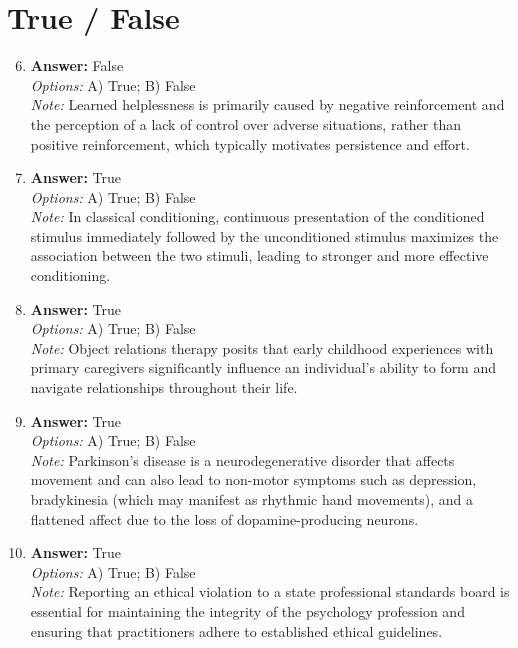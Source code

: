 \documentclass[12pt]{article}
\begin{document}
\section*{True / False}
\begin{enumerate}[label=\arabic*.]
\setcounter{enumi}{5}
\item \textbf{Answer:} False
\\ \textit{Options:} A) True; B) False
\\ \textit{Note:} Learned helplessness is primarily caused by negative reinforcement and the perception of a lack of control over adverse situations, rather than positive reinforcement, which typically motivates persistence and effort.
\item \textbf{Answer:} True
\\ \textit{Options:} A) True; B) False
\\ \textit{Note:} In classical conditioning, continuous presentation of the conditioned stimulus immediately followed by the unconditioned stimulus maximizes the association between the two stimuli, leading to stronger and more effective conditioning.
\item \textbf{Answer:} True
\\ \textit{Options:} A) True; B) False
\\ \textit{Note:} Object relations therapy posits that early childhood experiences with primary caregivers significantly influence an individual's ability to form and navigate relationships throughout their life.
\item \textbf{Answer:} True
\\ \textit{Options:} A) True; B) False
\\ \textit{Note:} Parkinson's disease is a neurodegenerative disorder that affects movement and can also lead to non-motor symptoms such as depression, bradykinesia (which may manifest as rhythmic hand movements), and a flattened affect due to the loss of dopamine-producing neurons.
\item \textbf{Answer:} True
\\ \textit{Options:} A) True; B) False
\\ \textit{Note:} Reporting an ethical violation to a state professional standards board is essential for maintaining the integrity of the psychology profession and ensuring that practitioners adhere to established ethical guidelines.
\end{enumerate}
\end{document}
